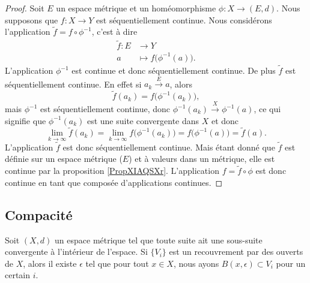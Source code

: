 \begin{proof}
    Soit \( E\) un espace métrique et un homéomorphisme \( \phi\colon X\to (E,d)\). Nous supposons que \( f\colon X\to Y\) est séquentiellement continue. Nous considérons l'application \( \tilde f=f\circ\phi^{-1}\), c'est à dire
    \begin{equation}
        \begin{aligned}
            \tilde f\colon E&\to Y \\
            a&\mapsto f\big( \phi^{-1}(a) \big). 
        \end{aligned}
    \end{equation}
    L'application \( \phi^{-1}\) est continue et donc séquentiellement continue. De plus \( \tilde f\) est séquentiellement continue. En effet si \( a_k\stackrel{E}{\longrightarrow}a\), alors
    \begin{equation}
        \tilde f(a_k)=f\big( \phi^{-1}(a_k) \big),
    \end{equation}
    mais \( \phi^{-1}\) est séquentiellement continue, donc \( \phi^{-1}(a_k)\stackrel{X}{\longrightarrow}\phi^{-1}(a)\), ce qui signifie que \( \phi^{-1}(a_k)\) est une suite convergente dans \( X\) et donc
    \begin{equation}
        \lim_{k\to \infty} \tilde f(a_k)=\lim_{k\to \infty} f\big( \phi^{-1}(a_k) \big)=f\big( \phi^{-1}(a) \big)=\tilde f(a).
    \end{equation}
    L'application \( \tilde f\) est donc séquentiellement continue. Mais étant donné que \( \tilde f\) est définie sur un espace métrique (\( E\)) et à valeurs dans un métrique, elle est continue par la proposition \ref{PropXIAQSXr}. L'application \( f=\tilde f\circ\phi\) est donc continue en tant que composée d'applications continues.
\end{proof}

\subsection{Compacité}

\begin{lemma}    \label{LemQFXOWyx}
    Soit \( (X,d)\) un espace métrique tel que toute suite ait une sous-suite convergente à l'intérieur de l'espace. Si \( \{ V_i \}\) est un recouvrement par des ouverts de \( X\), alors il existe \( \epsilon\) tel que pour tout \( x\in X\), nous ayons \( B(x,\epsilon)\subset V_i\) pour un certain \( i\).
\end{lemma}

